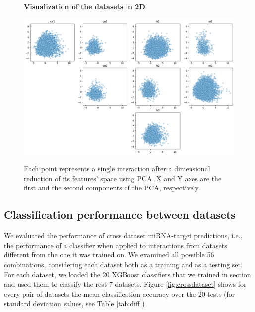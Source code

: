 \begin{figure}[h!]
  \caption{\textbf{Visualization of the datasets in 2D}} 
       \includegraphics[width = 1\textwidth]{figures/5_unite_features_pca_resample_scale=True_all.png}
      \label{fig:feature_pca}
      \caption*{Each point represents a single interaction after a dimensional reduction of its features' space using PCA. X and Y axes are the first and the second components of the PCA, respectively.}
      \end{figure}

  


\subsection{Classification performance between datasets}
We evaluated the performance of cross dataset miRNA-target predictions, i.e., the performance of a classifier when applied to interactions from datasets different from the one it was trained on.
We examined all possible 56 combinations, considering each dataset both as a training and as a testing set. 
For each dataset, we loaded the 20 XGBoost classifiers that we trained in section  and used them to classify the rest 7 datasets. Figure \ref{fig:crossdataset} shows for every pair of datasets the mean classification accuracy over the 20 tests (for standard deviation values, see Table \ref{tab:diff})

